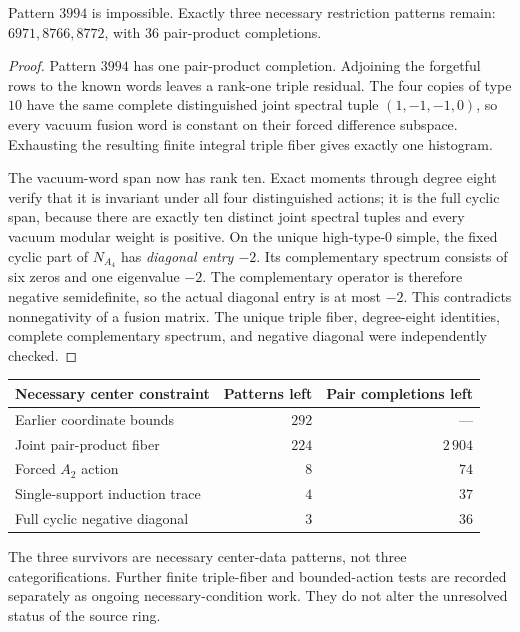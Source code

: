 \begin{proposition}
Pattern $3994$ is impossible.  Exactly three necessary restriction
patterns remain: $6971,8766,8772$, with $36$ pair-product completions.
\end{proposition}
\begin{proof}
Pattern $3994$ has one pair-product completion.  Adjoining the forgetful
rows to the known words leaves a rank-one triple residual.  The four
copies of type $10$ have the same complete distinguished joint spectral
tuple $(1,-1,-1,0)$, so every vacuum fusion word is constant on their
forced difference subspace.  Exhausting the resulting finite integral
triple fiber gives exactly one histogram.

The vacuum-word span now has rank ten.  Exact moments through degree eight
verify that it is invariant under all four distinguished actions; it is
the full cyclic span, because there are exactly ten distinct joint
spectral tuples and every vacuum modular weight is positive.  On the
unique high-type-$0$ simple, the fixed cyclic part of $N_{A_4}$ has
\emph{diagonal entry $-2$}.  Its complementary spectrum consists of six
zeros and one eigenvalue $-2$.  The complementary operator is therefore
negative semidefinite, so the actual diagonal entry is at most $-2$.
This contradicts nonnegativity of a fusion matrix.  The unique triple
fiber, degree-eight identities, complete complementary spectrum, and
negative diagonal were independently checked.
\end{proof}

\begin{center}
\begin{tabular}{lrr}
Necessary center constraint & Patterns left & Pair completions left\\
\hline
Earlier coordinate bounds & $292$ & ---\\
Joint pair-product fiber & $224$ & $2\,904$\\
Forced $A_2$ action & $8$ & $74$\\
Single-support induction trace & $4$ & $37$\\
Full cyclic negative diagonal & $3$ & $36$
\end{tabular}
\end{center}

The three survivors are necessary center-data patterns, not three
categorifications.  Further finite triple-fiber and bounded-action tests
are recorded separately as ongoing necessary-condition work.  They do
not alter the unresolved status of the source ring.
